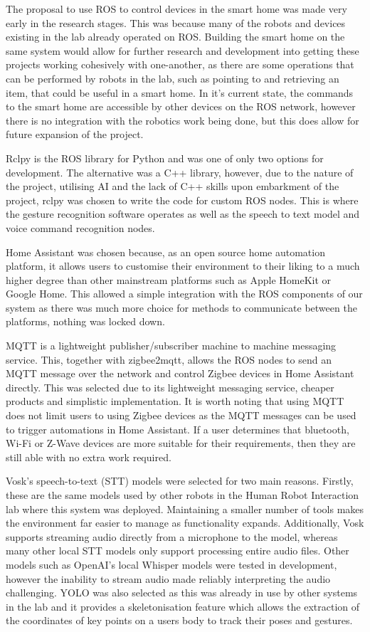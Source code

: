 The proposal to use ROS to control devices in the smart home was made very early in the research stages.
This was because many of the robots and devices existing in the lab already operated on ROS.
Building the smart home on the same system would allow for further research and development into getting these projects working cohesively with one-another, as there are some operations that can be performed by robots in the lab, such as pointing to and retrieving an item, that could be useful in a smart home.
In it's current state, the commands to the smart home are accessible by other devices on the ROS network, however there is no integration with the robotics work being done, but this does allow for future expansion of the project.

Rclpy is the ROS library for Python and was one of only two options for development.
The alternative was a C++ library, however, due to the nature of the project, utilising AI and the lack of C++ skills upon embarkment of the project, rclpy was chosen to write the code for custom ROS nodes.
This is where the gesture recognition software operates as well as the speech to text model and voice command recognition nodes.

Home Assistant was chosen because, as an open source home automation platform, it allows users to customise their environment to their liking to a much higher degree than other mainstream platforms such as Apple HomeKit or Google Home.
This allowed a simple integration with the ROS components of our system as there was much more choice for methods to communicate between the platforms, nothing was locked down.

MQTT is a lightweight publisher/subscriber machine to machine messaging service.
This, together with zigbee2mqtt, allows the ROS nodes to send an MQTT message over the network and control Zigbee devices in Home Assistant directly.
This was selected due to its lightweight messaging service, cheaper products and simplistic implementation.
It is worth noting that using MQTT does not limit users to using Zigbee devices as the MQTT messages can be used to trigger automations in Home Assistant.
If a user determines that bluetooth, Wi-Fi or Z-Wave devices are more suitable for their requirements, then they are still able with no extra work required.

Vosk's speech-to-text (STT) models were selected for two main reasons.
Firstly, these are the same models used by other robots in the Human Robot Interaction lab where this system was deployed.
Maintaining a smaller number of tools makes the environment far easier to manage as functionality expands.
Additionally, Vosk supports streaming audio directly from a microphone to the model, whereas many other local STT models only support processing entire audio files.
Other models such as OpenAI's local Whisper models were tested in development, however the inability to stream audio made reliably interpreting the audio challenging.
YOLO was also selected as this was already in use by other systems in the lab and it provides a skeletonisation feature which allows the extraction of the coordinates of key points on a users body to track their poses and gestures. 

